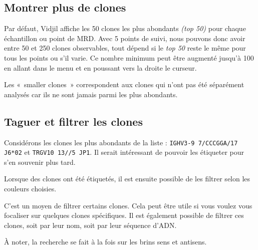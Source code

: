 \documentclass[10pt]{article}
\begin{document}
\subsection{Montrer plus de clones}

Par défaut, Vidjil affiche les 50 clones les plus abondants \textit{(top 50)}
pour chaque échantillon ou point de MRD. Avec 5 points de suivi, nous
pouvons donc avoir entre 50 et 250 clones observables, tout dépend si le
\textit{top 50} reste le même pour tous les points ou s'il varie.
Ce nombre
minimum peut être augmenté jusqu'à 100 en allant dans le menu  et en
poussant vers la droite le curseur.

 Les «~smaller clones~» correspondent aux clones qui n'ont
  pas été séparément analysés car ils ne sont jamais parmi les plus abondants.


\subsection{Taguer et filtrer les clones}

Considérons les clones les plus abondants de la liste :
\texttt{IGHV3-9 7/CCCGGA/17 J6*02} et \texttt{TRGV10 13//5 JP1}.
Il serait intéressant de pouvoir les étiqueter pour s'en souvenir plus tard.


Lorsque des clones ont été étiquetés, il est ensuite possible de
les filtrer selon les couleurs choisies.


C'est un moyen de filtrer certains clones. Cela peut être utile si vous
voulez vous focaliser sur quelques clones spécifiques. Il est également
possible de filtrer ces clones, soit par leur nom, soit par leur séquence
d'ADN.

À noter, la recherche se fait à la fois sur les brins sens
  et antisens.
\end{document}
